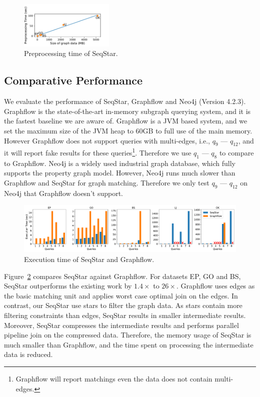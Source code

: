 \begin{figure}[ht]
  \centering
  \includegraphics[width=0.4\textwidth]{img/exp_preprocessing.pdf}
  \caption{Preprocessing time of SeqStar.}\label{img:exp_preprocessing}
\end{figure}
\subsection{Comparative Performance}\label{sec:experiments_compare}
We evaluate the performance of SeqStar, Graphflow and Neo4j (Version 4.2.3).
Graphflow is the state-of-the-art in-memory subgraph querying system,
and it is the fastest baseline we are aware of.
Graphflow is a JVM based system, and we set the maximum size of the JVM heap to 60GB to full use of the main memory.
However Graphflow does not support queries with multi-edges, i.e., $q_9$ --- $q_{12}$,
and it will report fake results for these queries\footnote{Graphflow will report matchings even the data does not contain multi-edges.}.
Therefore we use $q_1$ --- $q_8$ to compare to Graphflow.
Neo4j is a widely used industrial graph database, which fully supports the property graph model.
However, Neo4j runs much slower than Graphflow and SeqStar for graph matching.
Therefore we only test $q_9$ --- $q_{12}$  on Neo4j that Graphflow doesn't support.

\begin{figure}[ht]
  \centering
  \includegraphics[width=\textwidth]{img/exp_compare.pdf}
  \caption{Execution time of SeqStar and Graphflow.}\label{img:exp_compare}
\end{figure}

Figure~\ref{img:exp_compare} compares SeqStar against Graphflow.
For datasets EP, GO and BS, SeqStar outperforms the existing work by $1.4\times$ to $26\times$.
Graphflow uses edges as the basic matching unit and applies worst case optimal join on the edges.
In contrast, our SeqStar use stars to filter the graph data.
As stars contain more filtering constraints than edges, SeqStar results in smaller intermediate results.
Moreover, SeqStar compresses the intermediate results and performs parallel pipeline join on the compressed data.
Therefore, the memory usage of SeqStar is much smaller than Graphflow,
and the time spent on processing the intermediate data is reduced.

